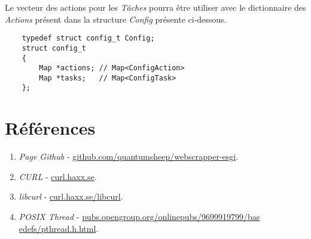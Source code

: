 \documentclass[conference]{IEEEtran}
\begin{document}
Le vecteur des actions pour les \textit{Tâches} pourra être utiliser avec le dictionnaire des \textit{Actions} présent dans la structure \textit{Config} présente ci-dessous.

\begin{lstlisting}
    typedef struct config_t Config;
    struct config_t
    {
        Map *actions; // Map<ConfigAction>
        Map *tasks;   // Map<ConfigTask>
    };
\end{lstlisting}

\section{Références}

\begin{enumerate}
    \item \textit{Page Github} - \href{https://github.com/quantumsheep/webscrapper-esgi}{github.com/quantumsheep/webscrapper-esgi}.
    \item \textit{CURL} - \href{https://curl.haxx.se/}{curl.haxx.se}.
    \item \textit{libcurl} - \href{https://curl.haxx.se/libcurl/}{curl.haxx.se/libcurl}.
    \item \textit{POSIX Thread} - \href{https://pubs.opengroup.org/onlinepubs/9699919799/basedefs/\\pthread.h.html}{pubs.opengroup.org/onlinepubs/9699919799/bas\\edefs/pthread.h.html}.
\end{enumerate}
\end{document}
